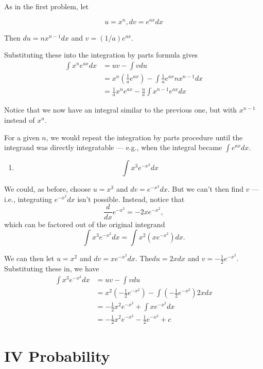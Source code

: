 \documentclass[
  letterpaper,
]{book}
\providecommand{\tightlist}{%
  \setlength{\itemsep}{0pt}\setlength{\parskip}{0pt}}\usepackage{longtable,booktabs,array}
\theoremstyle{definition}
\theoremstyle{definition}
\theoremstyle{plain}
\theoremstyle{definition}
\theoremstyle{plain}
\theoremstyle{plain}
\theoremstyle{remark}
\begin{document}
As in the first problem, let

\[u=x^n, dv=e^{ax}dx\]

Then \(du=n x^{n-1}dx\) and \(v=(1/a)e^{ax}\).

Substituting these into the integration by parts formula gives
\begin{align*}
    \int x^n e^{ax} dx &= u v - \int v du\nonumber\\
    &=x^n\left( \frac{1}{a}e^{ax}\right) - \int\frac{1}{a}e^{ax} n x^{n-1} dx\nonumber\\
    &=\frac{1}{a}x^n e^{ax} - \frac{n}{a}\int x^{n-1}e^{ax}dx\nonumber
\end{align*}

Notice that we now have an integral similar to the previous one, but
with \(x^{n-1}\) instead of \(x^n\).

For a given \(n\), we would repeat the integration by parts procedure
until the integrand was directly integratable --- e.g., when the
integral became \(\int e^{ax}dx\).

\begin{enumerate}
\def\labelenumi{\arabic{enumi}.}
\setcounter{enumi}{1}
\tightlist
\item
  \[\int x^3 e^{-x^2} dx\]
\end{enumerate}

We could, as before, choose \(u=x^3\) and \(dv=e^{-x^2}dx\). But we
can't then find \(v\) --- i.e., integrating \(e^{-x^2}dx\) isn't
possible. Instead, notice that \[\frac{d}{dx}e^{-x^2} = -2xe^{-x^2},\]
which can be factored out of the original integrand
\[\int x^3 e^{-x^2} dx = \int x^2 (xe^{-x^2})dx.\]

We can then let \(u=x^2\) and \(dv=x e^{-x^2}dx\). The\(du=2x dx\) and
\(v=-\frac{1}{2}e^{-x^2}\). Substituting these in, we have
\begin{align*}
    \int x^3 e^{-x^2} dx &= u v - \int v du\nonumber\\
    &= x^2 \left( -\frac{1}{2}e^{-x^2}\right) -\int \left(-\frac{1}{2}e^{-x^2}\right)2x dx\nonumber\\
    &= -\frac{1}{2}x^2 e^{-x^2}+\int x e^{-x^2}dx\nonumber\\
    &= -\frac{1}{2}x^2 e^{-x^2}-\frac{1}{2}e^{-x^2}+c\nonumber
\end{align*}

\part{IV Probability}
\end{document}
